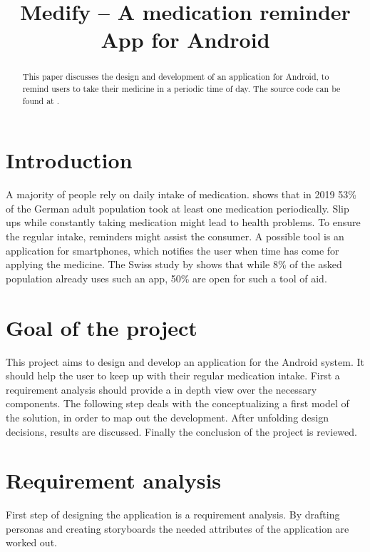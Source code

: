 \documentclass[conference]{IEEEtran}
\begin{document}
\title{Medify -- A medication reminder App for Android}

\author{}

\maketitle

\begin{abstract}
This paper discusses the design and development of an application for Android, to remind users
to take their medicine in a periodic time of day. The source code can be found at \cite{medify}.
\end{abstract}

\section{Introduction}
A majority of people rely on daily intake of medication. \cite{polymedikation} shows that in 2019 53\% of
the German adult population took at least one medication periodically. Slip ups while constantly taking
medication might lead to health problems. To ensure the regular intake, reminders might assist
the consumer. A possible tool is an application for smartphones, which notifies the
user when time has come for applying the medicine. The Swiss study by \cite{erinnerung_app} shows that
while 8\% of the asked population already uses such an app, 50\% are open for such a tool of aid.

\section{Goal of the project}
This project aims to design and develop an application for the Android system. It should help the user to
keep up with their regular medication intake.
First a requirement analysis should provide a in depth view over the necessary components. 
The following step deals with the conceptualizing a first model of the solution, in order to map out
the development. After unfolding design decisions, results are discussed. Finally the 
conclusion of the project is reviewed.

\section{Requirement analysis}
First step of designing the application is a requirement analysis. By drafting personas and creating
storyboards the needed attributes of the application are worked out.
\end{document}

